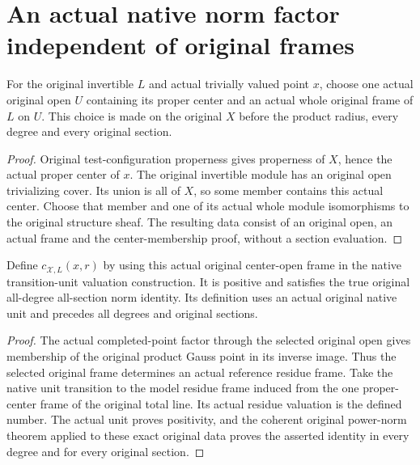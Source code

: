 \section{An actual native norm factor independent of original frames}

\begin{definition}\label{def:native-tc-original-center-open-frame-data}
\leanok
{}
For the original invertible $L$ and actual trivially valued
point $x$, choose one actual original open $U$ containing its
proper center and an actual whole original frame of $L$ on $U$.
This choice is made on the original $X$ before the product
radius, every degree and every original section.
\end{definition}
\begin{proof}
Original test-configuration properness gives properness of
$X$, hence the actual proper center of $x$. The original
invertible module has an original open trivializing cover.
Its union is all of $X$, so some member contains this actual
center. Choose that member and one of its actual whole module
isomorphisms to the original structure sheaf. The resulting
data consist of an original open, an actual frame and the
center-membership proof, without a section evaluation.
\end{proof}

\begin{definition}\label{def:native-tc-intrinsic-native-unit-factor}
\leanok
{}
Define $c_{\mathcal X,L}(x,r)$ by using this actual original
center-open frame in the native transition-unit valuation
construction. It is positive and satisfies the true original
all-degree all-section norm identity. Its definition uses an
actual original native unit and precedes all degrees and
original sections.
\end{definition}
\begin{proof}
The actual completed-point factor through the selected original
open gives membership of the original product Gauss point in
its inverse image. Thus the selected original frame determines
an actual reference residue frame. Take the native unit
transition to the model residue frame induced from the one
proper-center frame of the original total line. Its actual
residue valuation is the defined number. The actual unit
proves positivity, and the coherent original power-norm theorem
applied to these exact original data proves the asserted
identity in every degree and for every original section.
\end{proof}

